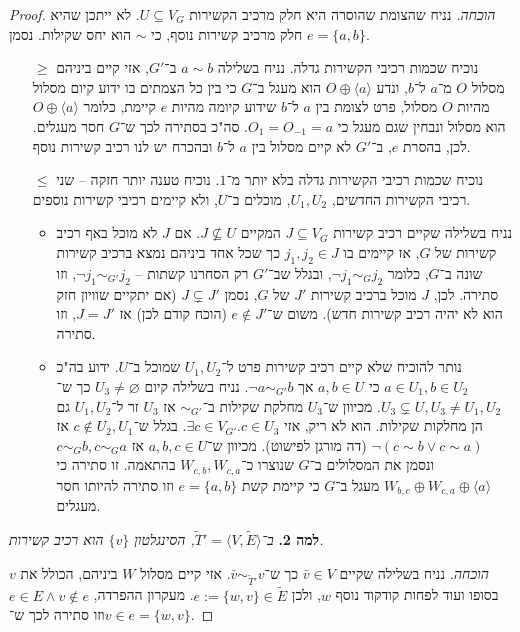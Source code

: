 \documentclass[]{article}
\newcommand\ra    {\rangle}
\newcommand\la    {\langle}
\newcommand\tl    {\tilde}
\begin{document}
\begin{proof}
		\textit{הוכחה. }נניח שהצומת שהוסרה היא חלק מרכיב הקשירות $U \subseteq V_G$. לא ייתכן שהיא חלק מרכיב קשירות נוסף, כי $\sim$ הוא יחס שקילות. נסמן $e = \{a, b\}$. 
		\begin{itemize}
			\item[$\ge$] נוכיח שכמות רכיבי הקשירות גדלה. נניח בשלילה $a \sim b$ ב־$G'$, אזי קיים ביניהם מסלול $O$ מ־$a$  ל־$b$, ונדע $O \oplus \la a \ra$ הוא מעגל ב־$G$ כי בין כל הצמתים בו ידוע קיום מסלול מהיות $O$ מסלול, פרט לצומת בין $a$ ל־$b$ שידוע קיומה מהיות $e$ קיימת, כלומר $O \oplus \la a \ra$ הוא מסלול ונבחין שגם מעגל כי $O_1 = O_{-1} = a$. סה"כ בסתירה לכך ש־$G$ חסר מעגלים. לכן, בהסרת $e$, ב־$G'$ לא קיים מסלול בין $a$ ל־$b$ ובהכרח יש לנו רכיב קשירות נוסף. 
			\item[$\le$] נוכיח שכמות רכיבי הקשירות גדלה בלא יותר מ־$1$. נוכיח טענה יותר חזקה – שני רכיבי הקשירות החדשים, $U_1, U_2$, מוכלים ב־$U$, ולא קיימים רכיבי קשירות נוספים. 
			\begin{itemize}
				\item נניח בשלילה שקיים רכיב קשירות $J \subseteq V_{G}$ המקיים $J \nsubseteq U$. אם $J$ לא מוכל באף רכיב קשירות של $G$, אז קיימים בו $j_1, j_2 \in J$ כך שכל אחד ביניהם נמצא ברכיב קשירות שונה ב־$G$, כלומר $\lnot j_1 \sim_{G} j_2$, ובגלל שב־$G'$ רק הסחרנו קשתות – $\lnot j_1 \sim_{G'} j_2$, וזו סתירה. לכן, $J$ מוכל ברכיב קשירות $J'$ של $G$, נסמן $J \subsetneq J'$ (אם יתקיים שוויון חזק הוא לא יהיה רכיב קשירות חדש). משום ש־$e \notin J'$ (הוכח קודם לכן) אז $J = J'$, וזו סתירה.
				\item נותר להוכיח שלא קיים רכיב קשירות פרט ל־$U_1, U_2$ שמוכל ב־$U$. ידוע בה"כ $a \in U_1, b \in U_2$ כי $a, b \in U$ אך $\lnot a \sim_{G'} b$. נניח בשלילה קיום $U_3 \neq \varnothing$ כך ש־$U_3 \subsetneq U, U_3 \neq U_1, U_2$. מכיוון ש־$U_3$ מחלקת שקילות ב־$\sim_{G'}$ אז $U_3$ זר ל־$U_1, U_2$ גם הן מחלקות שקילות. הוא לא ריק, אזי $\exists c \in V_{G'}. c \in U_3$. בגלל ש־$c \notin U_2, U_1$ אז $\lnot (c \sim b \lor c \sim a)$ (דה מורגן לפישוט). מכיוון ש־$a, b, c \in U$ אז $c \sim_{G} b, c \sim_G a$ ונסמן את המסלולים ב־$G$ שנוצרו כ־$W_{c, b}, W_{c, a}$ בהתאמה. זו סתירה כי $W_{b, c} \oplus W_{c, a} \oplus \la a \ra$ מעגל ב־$G$ כי קיימת קשת $e = \{a, b\}$ וזו סתירה להיותו חסר מעגלים. 
			\end{itemize}
		\end{itemize}
		\textbf{למה 2. }\textit{ב־$\tl T' = \la V, \tl E \ra$, הסינגלטון $\{v\}$ הוא רכיב קשירות. }
		
		\textit{הוכחה. }נניח בשלילה שקיים $\bar v \in V$ כך ש־$\bar v \sim_{\tl T'} v$. אזי קיים מסלול $W$ ביניהם, הכולל את $v$ בסופו ועוד לפחות קודקוד נוסף $w$, ולכן $e := \{w, v\} \in \tl E$. מעקרון ההפרדה, $e \in E \land v \notin e$ וזו סתירה לכך ש־$v \in e = \{w, v\}$. 
		

\end{proof}
\end{document}
